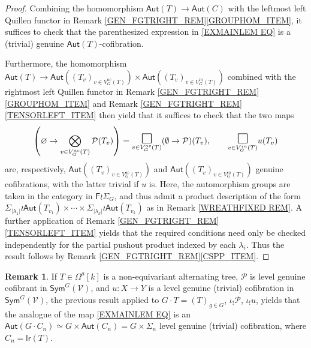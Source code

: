 \documentclass[a4paper,10pt
,draft
]{article}%
\numberwithin{equation}{section}
\numberwithin{figure}{section}
\theoremstyle{definition} %
\newtheorem{remark}[equation]{Remark}%
\newcommand{\Fin}{\mathsf{F}}%
\newcommand{\V}{\ensuremath{\mathcal V}}
\renewcommand{\P}{\ensuremath{\mathcal P}}
\newcommand{\1}{\ensuremath{\mathbbm 1}}%
\begin{document}
\begin{proof}
	Combining the homomorphism $\mathsf{Aut}(T) \to \mathsf{Aut}(C)$ with the leftmost left Quillen functor in 
	Remark \ref{GEN_FGTRIGHT_REM}\ref{GROUPHOM_ITEM},
	it suffices to check that the parenthesized 
	expression in \eqref{EXMAINLEM EQ}
	is a (trivial) genuine 
	$\mathsf{Aut}(T)$-cofibration.

	Furthermore, the homomorphism
	$\mathsf{Aut}(T) \to 
	\mathsf{Aut}\left( (T_v)_{v \in V_G^{ac}(T)}\right) \times 
	\mathsf{Aut}\left( (T_v)_{v \in V_G^{in}(T)}\right)$
	combined with the rightmost left Quillen functor in Remark \ref{GEN_FGTRIGHT_REM}\ref{GROUPHOM_ITEM} and Remark \ref{GEN_FGTRIGHT_REM}\ref{TENSORLEFT_ITEM}
	then yield that it suffices to check that the two maps
\[
\left( \varnothing \to \bigotimes\limits_{v \in V_{G}^{ac}(T)}\P(T_v) \right)
=
\underset{v \in V_{G}^{ac}(T)}{\mathlarger{\mathlarger{\mathlarger{\square}}}}
(\emptyset \to \P)(T_v),
	\qquad
\underset{v \in V_{G}^{in}(T)}{\mathlarger{\mathlarger{\mathlarger{\square}}}}
u(T_v)
\]
are, respectively, 
$\mathsf{Aut}\left( (T_v)_{v \in V_G^{ac}(T)}\right)$ and 
$\mathsf{Aut}\left( (T_v)_{v \in V_G^{in}(T)}\right)$
genuine cofibrations, with the latter trivial if $u$ is. Here, the automorphism groups are taken in the category in $\Fin \wr \Sigma_G$,
and thus admit a product description of the form
$
	\Sigma_{|\lambda_1|} \wr 
	\mathsf{Aut}(T_{v_1})
		\times \cdots \times	
	\Sigma_{|\lambda_k|} \wr 
	\mathsf{Aut}(T_{v_k})
$
as in Remark \ref{WREATHFIXED REM}.
A further application of Remark \ref{GEN_FGTRIGHT_REM}\ref{TENSORLEFT_ITEM}
yields that the required conditions need only be checked independently for the
partial pushout product indexed by each $\lambda_i$.
Thus the result follows by Remark \ref{GEN_FGTRIGHT_REM}\ref{CSPP_ITEM}.
\end{proof}


\begin{remark}\label{EXMAINLEM REM}
If %
$T \in \Omega^a[k]$ is a non-equivariant alternating tree, 
$\mathcal{P}$ is level genuine cofibrant in $\mathsf{Sym}^G(\V)$,
and
$u \colon X \to Y$ is a level genuine (trivial) cofibration in $\mathsf{Sym}^G(\V)$,
the previous result applied to
$G \cdot T = (T)_{g \in G}$,
$\iota_{!} \mathcal{P}$,
$\iota_{!} u$,
yields that
the analogue of the map
\eqref{EXMAINLEM EQ}
is an $\mathsf{Aut}(G \cdot C_n) 
\simeq G 
\times \mathsf{Aut}(C_n)=
G \times \Sigma_n$ level genuine (trivial) cofibration,
where $C_n = \mathsf{lr}(T)$.
\end{remark}
\end{document}
